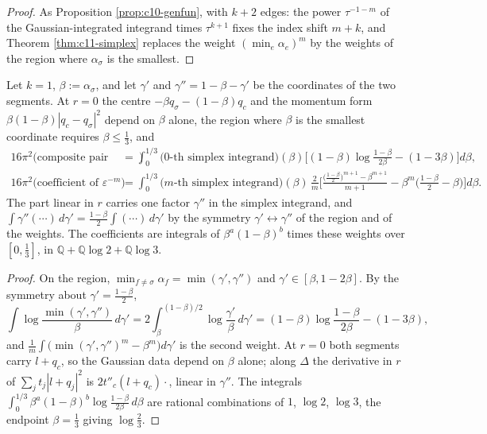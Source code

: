 \begin{proof}
As Proposition \ref{prop:c10-genfun}, with $k+2$ edges: the power $\tau^{-1-m}$ of the Gaussian-integrated integrand times $\tau^{k+1}$ fixes the index shift $m+k$, and Theorem \ref{thm:c11-simplex} replaces the weight $(\min_e\alpha_e)^m$ by the weights of the region where $\alpha_\sigma$ is the smallest.
\end{proof}

\begin{proposition}
\label{prop:c11-k1}
Let $k=1$, $\beta:=\alpha_\sigma$, and let $\gamma'$ and $\gamma''=1-\beta-\gamma'$ be the coordinates of the two segments. At $r=0$ the centre $-\beta q_\sigma-(1-\beta)q_c$ and the momentum form $\beta(1-\beta)|q_c-q_\sigma|^2$ depend on $\beta$ alone, the region where $\beta$ is the smallest coordinate requires $\beta\le\tfrac13$, and
\[
\begin{aligned}
16\pi^2\big(\text{composite pair kernel}\big)&=\int_0^{1/3}\big(0\text{-th simplex integrand}\big)(\beta)\Big[(1-\beta)\log\frac{1-\beta}{2\beta}-(1-3\beta)\Big]d\beta,\\
16\pi^2\big(\text{coefficient of }\varepsilon^{-m}\big)&=\int_0^{1/3}\big(m\text{-th simplex integrand}\big)(\beta)\,\frac2m\Big[\frac{\big(\tfrac{1-\beta}2\big)^{m+1}-\beta^{m+1}}{m+1}-\beta^m\Big(\frac{1-\beta}2-\beta\Big)\Big]d\beta .
\end{aligned}
\]
The part linear in $r$ carries one factor $\gamma''$ in the simplex integrand, and $\int\gamma''(\cdots)\,d\gamma'=\tfrac{1-\beta}2\int(\cdots)\,d\gamma'$ by the symmetry $\gamma'\leftrightarrow\gamma''$ of the region and of the weights. The coefficients are integrals of $\beta^a(1-\beta)^b$ times these weights over $[0,\tfrac13]$, in $\mathbb Q+\mathbb Q\log2+\mathbb Q\log3$.
\end{proposition}

\begin{proof}
On the region, $\min_{f\ne\sigma}\alpha_f=\min(\gamma',\gamma'')$ and $\gamma'\in[\beta,1-2\beta]$. By the symmetry about $\gamma'=\tfrac{1-\beta}2$,
\[
\int\log\frac{\min(\gamma',\gamma'')}\beta\,d\gamma'=2\int_\beta^{(1-\beta)/2}\log\frac{\gamma'}\beta\,d\gamma'=(1-\beta)\log\frac{1-\beta}{2\beta}-(1-3\beta),
\]
and $\frac1m\int\big(\min(\gamma',\gamma'')^m-\beta^m\big)d\gamma'$ is the second weight. At $r=0$ both segments carry $l+q_c$, so the Gaussian data depend on $\beta$ alone; along $\Delta$ the derivative in $r$ of $\sum_jt_j|l+q_j|^2$ is $2t''_c(l+q_c)\cdot$, linear in $\gamma''$. The integrals $\int_0^{1/3}\beta^a(1-\beta)^b\log\frac{1-\beta}{2\beta}\,d\beta$ are rational combinations of $1$, $\log2$, $\log3$, the endpoint $\beta=\tfrac13$ giving $\log\tfrac23$.
\end{proof}

